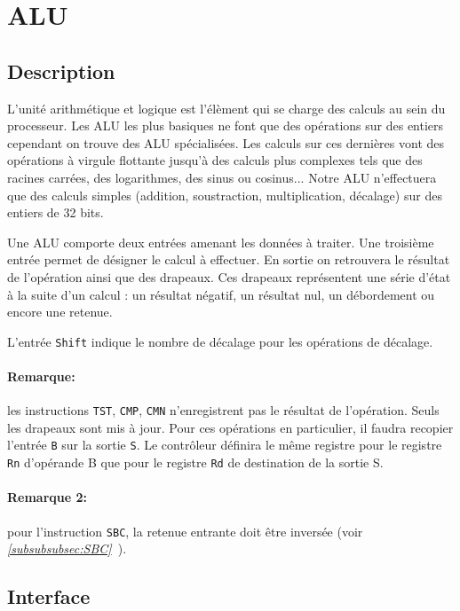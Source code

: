 \documentclass{article}
\begin{document}
    \section{ALU}
    \label{sec:ALU}

    \subsection{Description}

    L'unité arithmétique et logique est l'élèment qui se charge des calculs au sein du processeur.
    Les ALU les plus basiques ne font que des opérations sur des entiers cependant on trouve des ALU spécialisées.
    Les calculs sur ces dernières vont des opérations à virgule flottante jusqu'à des calculs plus complexes tels que des racines carrées, des logarithmes, des sinus ou cosinus... Notre ALU n'effectuera que des calculs simples (addition, soustraction, multiplication, décalage) sur des entiers de 32 bits.

    Une ALU comporte deux entrées amenant les données à traiter.
    Une troisième entrée permet de désigner le calcul à effectuer.
    En sortie on retrouvera le résultat de l'opération ainsi que des drapeaux.
    Ces drapeaux représentent une série d'état à la suite d'un calcul : un résultat négatif, un résultat nul, un débordement ou encore une retenue.

    L'entrée \texttt{Shift} indique le nombre de décalage pour les opérations de décalage.

    \paragraph{Remarque:} les instructions \texttt{TST}, \texttt{CMP}, \texttt{CMN} n'enregistrent pas le résultat de l'opération.
    Seuls les drapeaux sont mis à jour.
    Pour ces opérations en particulier, il faudra recopier l'entrée \texttt{B} sur la sortie \texttt{S}.
    Le contrôleur définira le même registre pour le registre \texttt{Rn} d'opérande B que pour le registre \texttt{Rd} de destination de la sortie S.

    \paragraph{Remarque 2:} pour l'instruction \texttt{SBC}, la retenue entrante doit être inversée (voir \textit{\ref{subsubsubsec:SBC}~}).

    \subsection{Interface}
\end{document}
